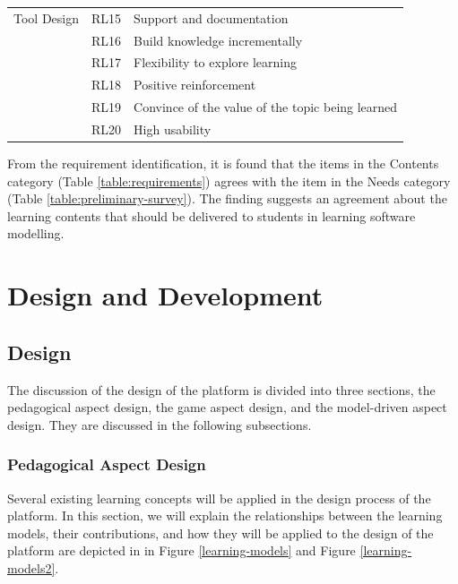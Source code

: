 \documentclass[12pt, a4paper]{report} \usepackage[titletoc]{appendix}
\begin{document}
\begin{appendices}
\begin{table}[ht]
\begin{center}
\begin{tabular}{ p{2cm}p{1cm}p{10cm} }
\hline
\multirow{1}{2cm}{Tool Design}
& RL15 & Support and documentation \\
& RL16 & Build knowledge incrementally \\
& RL17 & Flexibility to explore learning \\
& RL18 & Positive reinforcement \\
& RL19 & Convince of the value of the topic being learned \\ 
& RL20 & High usability \\ 
\hline
\end{tabular}
\end{center}
\end{table}
 
From the requirement identification, it is found that the items in the Contents category (Table \ref{table:requirements}) agrees with the item in the Needs category (Table \ref{table:preliminary-survey}). The finding suggests an agreement about the learning contents that should be delivered to students in learning software modelling.


\chapter{Design and Development}
\label{Design and Development}

\section{Design}
The discussion of the design of the platform is divided into three sections, the pedagogical aspect design, the game aspect design, and the model-driven aspect design. They are discussed in the following subsections.

\subsection{Pedagogical Aspect Design}
Several existing learning concepts will be applied in the design process of the platform. In this section, we will explain the relationships between the learning models, their contributions, and how they will be applied to the design of the platform are depicted in in Figure \ref{learning-models} and Figure \ref{learning-models2}.


\end{appendices}
\end{document}
